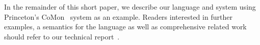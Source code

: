 In the remainder of this short paper, we describe our language and system
using Princeton's CoMon~\cite{comon} system as an example.
Readers interested in further examples,
a semantics for the language as well as comprehensive related work
should refer to our technical report~\cite{zhu+:padsdtr}.


